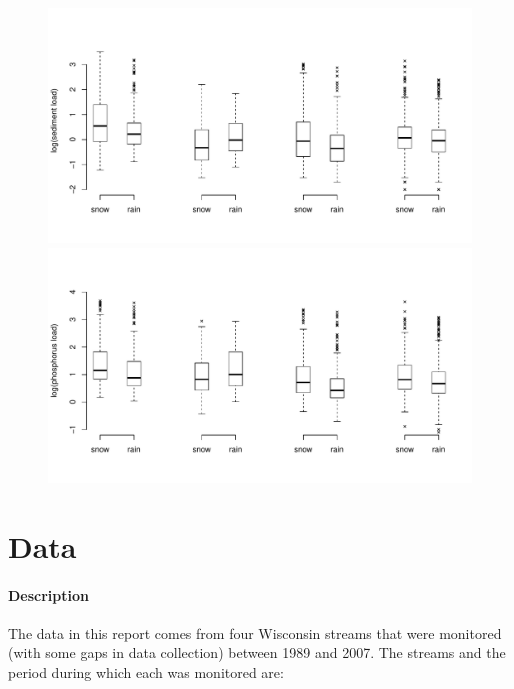 \documentclass[12pt]{article}
\begin{document}
\begin{figure}[h]
    \begin{center}
\includegraphics{loadings-boxplot_stot}
\includegraphics{loadings-boxplot_ptot}
    \end{center}
\end{figure}


















\section{Data}

\paragraph{Description}
The data in this report comes from four Wisconsin streams that were monitored (with some gaps in data collection) between 1989 and 2007. The streams and the period during which each was monitored are:
\end{document}
